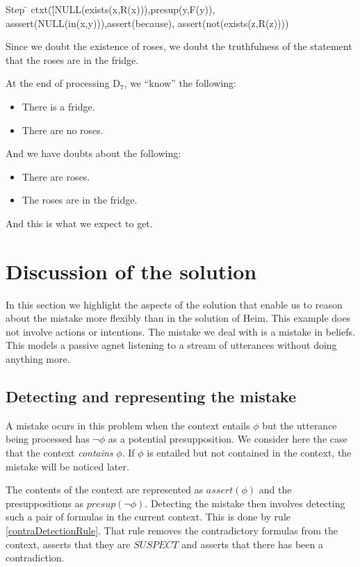 \documentclass{article}
\begin{document}
\begin{tabbing}
Step \= \> ctxt(\=[NULL(exists(x,R(x))),presup(y,F(y)),
asssert(NULL(in(x,y))),assert(because),
assert(not(exists(z,R(z))))\\
\end{tabbing}

Since we doubt the existence of roses, we doubt the truthfulness of
the statement that the roses are in the fridge.


At the end of processing D$_7$, we ``know'' the following:
\begin{itemize}
\item
There is a fridge.
\item
There are no roses.
\end{itemize}
And we have doubts about the following:
\begin{itemize}
\item
There are roses.
\item
The roses are in the fridge.
\end{itemize}

\noindent
And this is what we expect to get.

 
\section{Discussion of the solution}

In this section we highlight the aspects of the solution that enable
us to reason about the mistake more flexibly than in the solution of
Heim. This example does not involve actions or intentions. The mistake
we deal with is a mistake in beliefs. This models a passive agnet
listening to a stream of utterances without doing anything more.


\subsection{Detecting and representing the mistake}

A mistake ocurs in this problem when the context entails $\phi$ but
the utterance being processed has $\neg \phi$ as a potential
presupposition. We consider here the case that the context {\em
contains} $\phi$. If $\phi$ is entailed but not contained in the
context, the mistake will be noticed later.

The contents of the context are represented as $assert(\phi)$ and the
presuppositions as $presup(\neg \phi)$. Detecting the mistake then
involves detecting such a pair of formulas in the current
context. This is done by rule \ref{contraDetectionRule}. That rule
removes the contradictory formulas from the context, asserts that they
are $SUSPECT$ and asserts that there has been a contradiction.
\end{document}
